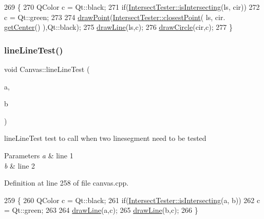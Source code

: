 \begin{DoxyCode}
269 \{
270     QColor c = Qt::black;
271     \textcolor{keywordflow}{if}(\hyperlink{class_intersect_tester_a7710e17ff7d2e229059f23b9429213f5}{IntersectTester::isIntersecting}(ls, cir))
272         c = Qt::green;
273 
274     \hyperlink{class_canvas_ad7cf8e6e93765586808ac744d888dbdc}{drawPoint}(\hyperlink{class_intersect_tester_a6bb20d4839643fbfd53a5d4506448a92}{IntersectTester::closestPoint}( ls, cir.
      \hyperlink{class_circle_a9818ca0bbac64ff447945a8e51ff9319}{getCenter}() ),Qt::black);
275     \hyperlink{class_canvas_ae3ad5d92c9a2868b94a6570914b05366}{drawLine}(ls,c);
276     \hyperlink{class_canvas_ab1413076d90539aea7ac3a06b065afe2}{drawCircle}(cir,c);
277 \}
\end{DoxyCode}
\mbox{\label{class_canvas_ac3e9882133dc6c55f8ff3bb119a8ed84}} 
\subsubsection{\texorpdfstring{line\+Line\+Test()}{lineLineTest()}}
{\footnotesize\ttfamily void Canvas\+::line\+Line\+Test (\begin{DoxyParamCaption}\item[{\hyperlink{class_line_segment}{Line\+Segment}}]{a,  }\item[{\hyperlink{class_line_segment}{Line\+Segment}}]{b }\end{DoxyParamCaption})\hspace{0.3cm}{\ttfamily [private]}}



line\+Line\+Test test to call when two linesegment need to be tested 


\begin{DoxyParams}{Parameters}
{\em a} & line 1 \\
\hline
{\em b} & line 2 \\
\hline
\end{DoxyParams}


Definition at line 258 of file canvas.\+cpp.


\begin{DoxyCode}
259 \{
260     QColor c = Qt::black;
261     \textcolor{keywordflow}{if}(\hyperlink{class_intersect_tester_a7710e17ff7d2e229059f23b9429213f5}{IntersectTester::isIntersecting}(a, b))
262         c = Qt::green;
263 
264     \hyperlink{class_canvas_ae3ad5d92c9a2868b94a6570914b05366}{drawLine}(a,c);
265     \hyperlink{class_canvas_ae3ad5d92c9a2868b94a6570914b05366}{drawLine}(b,c);
266 \}
\end{DoxyCode}
\mbox{\label{class_canvas_a2eaf680341aebbab7792cd136c2be950}} 
